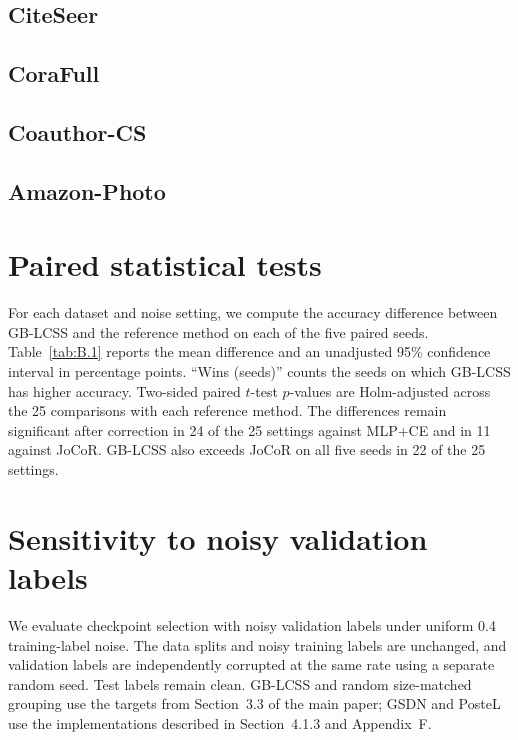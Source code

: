 \documentclass[a4paper,fleqn]{cas-sc}
\begin{document}



\subsection{CiteSeer}\label{sec:A.2}




\subsection{CoraFull}\label{sec:A.3}




\subsection{Coauthor-CS}\label{sec:A.4}




\subsection{Amazon-Photo}\label{sec:A.5}


\setcounter{table}{0}

\section{Paired statistical tests}\label{sec:B}

For each dataset and noise setting, we compute the accuracy difference between GB-LCSS and the reference method on each of the five paired seeds. Table~\ref{tab:B.1} reports the mean difference and an unadjusted 95\% confidence interval in percentage points. ``Wins (seeds)'' counts the seeds on which GB-LCSS has higher accuracy. Two-sided paired \(t\)-test \(p\)-values are Holm-adjusted across the 25 comparisons with each reference method. The differences remain significant after correction in 24 of the 25 settings against MLP+CE and in 11 against JoCoR. GB-LCSS also exceeds JoCoR on all five seeds in 22 of the 25 settings.


\setcounter{table}{0}

\section{Sensitivity to noisy validation labels}\label{sec:C}

We evaluate checkpoint selection with noisy validation labels under uniform 0.4 training-label noise. The data splits and noisy training labels are unchanged, and validation labels are independently corrupted at the same rate using a separate random seed. Test labels remain clean. GB-LCSS and random size-matched grouping use the targets from Section~3.3 of the main paper; GSDN and PosteL use the implementations described in Section~4.1.3 and Appendix~F.
\end{document}
